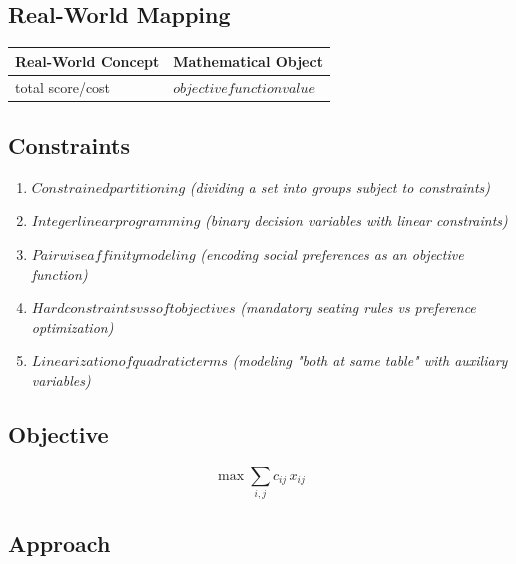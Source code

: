 \documentclass[11pt, a4paper]{article}
\begin{document}
\subsection{Real-World Mapping}

\begin{longtable}{ll}
\toprule
\textbf{Real-World Concept} & \textbf{Mathematical Object} \\
\midrule
\endhead
total score/cost & $objective function value$ \\
\bottomrule
\end{longtable}

\subsection{Constraints}

\begin{enumerate}
  \item $Constrained partitioning$
  \hfill \textit{(dividing a set into groups subject to constraints)}
  \item $Integer linear programming$
  \hfill \textit{(binary decision variables with linear constraints)}
  \item $Pairwise affinity modeling$
  \hfill \textit{(encoding social preferences as an objective function)}
  \item $Hard constraints vs soft objectives$
  \hfill \textit{(mandatory seating rules vs preference optimization)}
  \item $Linearization of quadratic terms$
  \hfill \textit{(modeling "both at same table" with auxiliary variables)}
\end{enumerate}

\subsection{Objective}

\begin{equation}
\max \sum_{i,j} c_{ij} \, x_{ij}
\end{equation}

\subsection{Approach}
\end{document}
